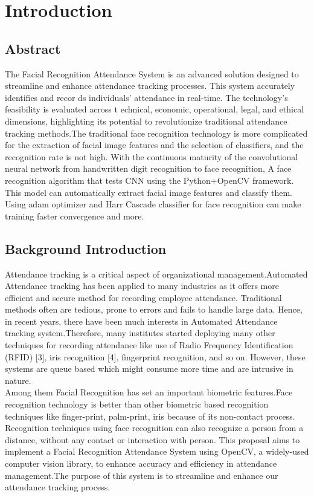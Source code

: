 \chapter{Introduction}
        \section{Abstract}
        The Facial Recognition Attendance System is an advanced solution designed to
 streamline and enhance attendance tracking processes. This system accurately identifies and recor
ds individuals' attendance in real-time. The technology's feasibility is evaluated across t
echnical, economic, operational, legal, and ethical dimensions, highlighting its potential to revolutionize 
traditional attendance tracking methods.The traditional face recognition technology is more complicated for the extraction of facial image features and the selection of classifiers, and the recognition rate is not high. With the continuous maturity of the convolutional neural network from handwritten
 digit recognition to face recognition, A face recognition algorithm that tests CNN using the Python+OpenCV framework. This model can automatically extract facial image features and classify them. Using adam optimizer and Harr Cascade classifier
 for face recognition can make training faster convergence and more.

        \section{Background Introduction}
        Attendance tracking is a critical aspect of organizational management.Automated Attendance tracking has been applied to many industries as it offers  more efficient 
and secure method for recording employee attendance.
 Traditional methods often are tedious, prone to errors and fails to handle large data. Hence, in
 recent years, there have been much interests in Automated Attendance tracking system.Therefore,  many  institutes  started deploying  many  other  techniques  for  recording  attendance like  use of  Radio Frequency  Identification (RFID)  [3], iris recognition [4], fingerprint recognition, and so on. However, these  systems  are queue  based which  might  consume  more time and are intrusive in nature.
 \\
 Among them Facial Recognition has set an important biometric features.Face recognition
technology is better than other biometric based recognition
techniques like finger-print, palm-print, iris because of its
non-contact process. Recognition techniques using face
recognition can also recognize a person from a distance,
without any contact or interaction with person.
 This proposal aims to implement a Facial Recognition Attendance System using OpenCV, a widely-used computer vision library, to enhance accuracy and efficiency in attendance management.The purpose of this system is to streamline and enhance our attendance 
tracking process.
 
